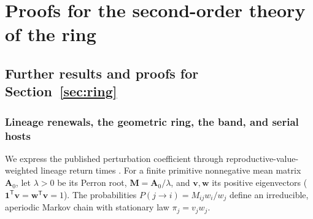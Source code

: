 \section{Proofs for the second-order theory of the ring}\label{app:ring}

\subsection{Further results and proofs for Section~\ref{sec:ring}}

\subsubsection{Lineage renewals, the geometric ring, the band, and serial hosts}\label{subsec:app-ring-basic}

We express the published perturbation coefficient \citep{ruelle1979,tuljapurkar1982a,tuljapurkar2006} through reproductive-value-weighted lineage return times \citep{bienvenu2015,bienvenu2017}. For a finite primitive nonnegative mean matrix $\mathbf{A}_0$, let $\lambda > 0$ be its Perron root, $\mathbf{M} = \mathbf{A}_0 / \lambda$, and $\mathbf{v}, \mathbf{w}$ its positive eigenvectors ($\mathbf{1}^{\mathsf{T}}\mathbf{v} = \mathbf{w}^{\mathsf{T}}\mathbf{v} = 1$). The probabilities $P(j \to i) = M_{ij} w_i / w_j$ define an irreducible, aperiodic Markov chain with stationary law $\pi_j = v_j w_j$.

